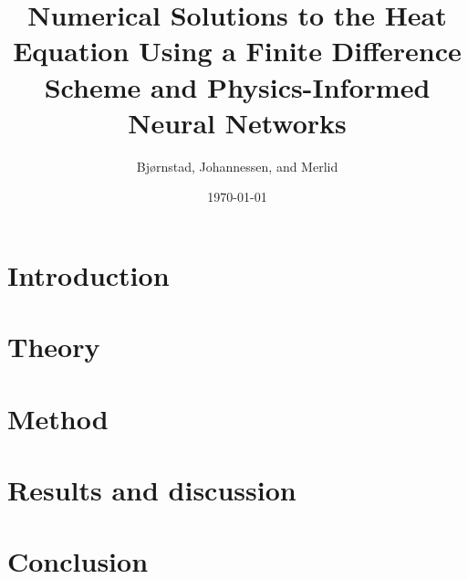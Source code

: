 \documentclass[aps,rmp,reprint,amsmath,amssymb,twocolumn,floatfix]{revtex4-1}
\begin{document}
\title{Numerical Solutions to the Heat Equation Using a Finite Difference Scheme and Physics-Informed Neural Networks}
\author{Bjørnstad, Johannessen, and Merlid}
\date{\today}


\begin{abstract}

\end{abstract}
\maketitle

\tableofcontents

\section{Introduction}
\label{sec:introduction}

\section{Theory}


\section{Method}\label{sec:methods3}


\section{Results and discussion}\label{sec:results_and_discussion}


%

\section{Conclusion}\label{sec:conclucion5}


\clearpage
{} %


\clearpage
\appendix
\label{appendix}

\clearpage
\end{document}
